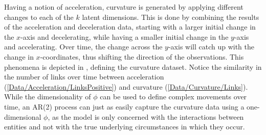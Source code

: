     Having a notion of acceleration, curvature is generated by applying different changes to each of the $k$ latent dimensions. This is done by combining the results of the acceleration and deceleration data, starting with a larger initial change in the $x$-axis and decelerating, while having a smaller initial change in the $y$-axis and accelerating. Over time, the change across the $y$-axis will catch up with the change in $x$-coordinates, thus shifting the direction of the observations. This phenomena is depicted in , defining the curvature dataset.
    Notice the similarity in the number of links over time between acceleration (\cref{Data/Acceleration/LinksPositive}) and curvature (\cref{Data/Curvature/Links}). While the dimensionality of $\phi$ can be used to define complex movements over time, an AR(2) process can just as easily capture the curvature data using a one-dimensional $\phi$, as the model is only concerned with the interactions between entities and not with the true underlying circumstances in which they occur.